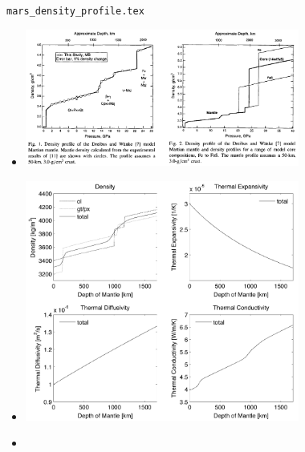\begin{flushright} {\tiny {\color{gray} \tt mars\_density\_profile.tex}} \end{flushright}

\begin{itemize}

\item {}

\begin{center}
\includegraphics[width=9cm]{images/mars/density/befe98}
\end{center}




\item {}

\begin{center}
\includegraphics[width=9cm]{images/mars/density/keta09}
\end{center}


\item {}


\end{itemize}

